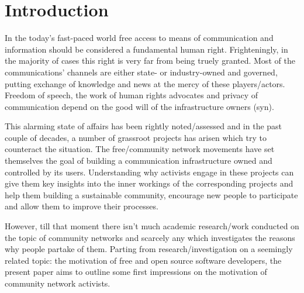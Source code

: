 \section{Introduction}

In the today's fast-paced world free access to means of communication and information should be considered a fundamental human right.
Frighteningly, in the majority of cases this right is very far from being truely granted.
Most of the communications' channels are either state- or industry-owned and governed, putting exchange of knowledge and news at the mercy of these players/actors.
Freedom of speech, the work of human rights advocates and privacy of communication depend on the good will of the infrastructure owners (syn).

This alarming state of affairs has been rightly noted/assessed and in the past couple of decades, a number of grassroot projects has arisen which try to counteract the situation.
The free/community network movements have set themselves the goal of building a communication infrastructure owned and controlled by its users.
Understanding why activists engage in these projects can give them key insights into the inner workings of the corresponding projects and help them building a sustainable community, encourage new people to participate and allow them to improve their processes.

However, till that moment there isn't much academic research/work conducted on the topic of community networks and scarcely any which investigates the reasons why people partake of them.
Parting from research/investigation on a seemingly related topic: the motivation of free and open source software developers, the present paper aims to outline some first impressions on the motivation of community network activists.

\begin{comment}
* Untersuchungsgegenstand
* Erkenntnisinteresse
* Forschungsstand
* Ergebnisse können/sollen angedeuten werden

Why is the topic relevant??

* grassroots movements
* one of the free/open movements which is relatively understudied till now
* understanding why
  ** may enhance motivation and performance (or not);
  ** or give activists insights into how to improve their processes
\end{comment}


